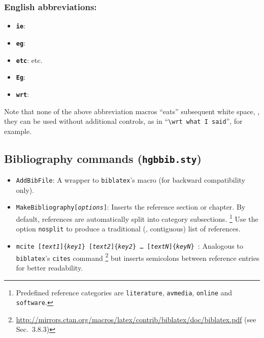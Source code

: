 \documentclass[english]{hgbarticle}
\begin{document}
\subsubsection*{English abbreviations:}

\begin{itemize}
    \item \textbf{\texttt{{\bs}ie}}: \ie
    \item \textbf{\texttt{{\bs}eg}}: \eg
    \item \textbf{\texttt{{\bs}etc}}: etc.
    \item \textbf{\texttt{{\bs}Eg}}: \Eg
    \item \textbf{\texttt{{\bs}wrt}}: \wrt
\end{itemize}

\noindent
Note that none of the above abbreviation macros ``eats'' subsequent white
space, \ie, they can be used without additional controls, as in
``\verb!\wrt what I said!'', for example.

\subsection{Bibliography commands (\texttt{hgbbib.sty})}

\begin{itemize}
    \item
    \texttt{{\bs}AddBibFile}: A wrapper to \texttt{biblatex}'s
    \verb!! macro (for backward compatibility only).
    \item
    \texttt{{\bs}MakeBibliography[\emph{options}]}: Inserts the
    reference section or chapter. By default, references are automatically
    split into category subsections.%
    \footnote{Predefined reference categories are \texttt{literature},
        \texttt{avmedia}, \texttt{online} and \texttt{software}.}
    Use the option \texttt{nosplit} to produce a traditional (\ie,
    contiguous) list of references.
    \item
    \texttt{{\bs}mcite%
        [\emph{text1}]\{\emph{key1}\}%
        [\emph{text2}]\{\emph{key2}\}%
        \ldots
        [\emph{textN}]\{\emph{keyN}\}%
    }:
    Analogous to \texttt{bib\-la\-tex}'s \texttt{{\bs}cites} command%
    \footnote{%
    \url{http://mirrors.ctan.org/macros/latex/contrib/biblatex/doc/biblatex.pdf}
    (see Sec.~3.8.3)} but inserts semicolons between reference entries for
    better readability.
\end{itemize}

\end{document}
